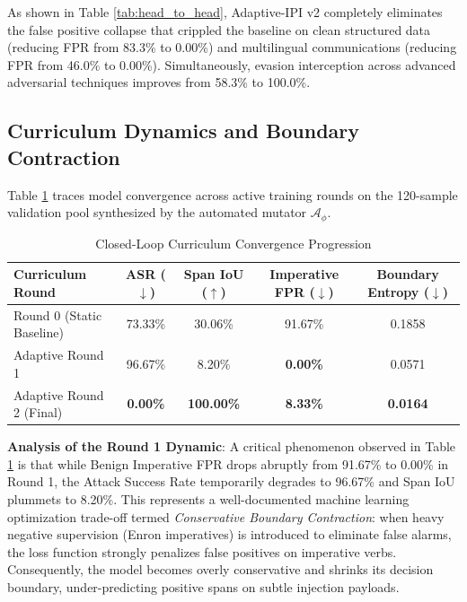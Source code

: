 \documentclass[conference]{IEEEtran}
\begin{document}
As shown in Table \ref{tab:head_to_head}, Adaptive-IPI v2 completely eliminates the false positive collapse that crippled the baseline on clean structured data (reducing FPR from 83.3\% to 0.00\%) and multilingual communications (reducing FPR from 46.0\% to 0.00\%). Simultaneously, evasion interception across advanced adversarial techniques improves from 58.3\% to 100.0\%.

\subsection{Curriculum Dynamics and Boundary Contraction}

Table \ref{tab:curriculum_progression} traces model convergence across active training rounds on the 120-sample validation pool synthesized by the automated mutator $\mathcal{A}_{\phi}$.

\begin{table}[tb]
\centering
\caption{Closed-Loop Curriculum Convergence Progression}
\label{tab:curriculum_progression}
\renewcommand{\arraystretch}{1.15}
\setlength{\tabcolsep}{4pt}
\footnotesize
\begin{tabular}{lcccc}
\toprule
\textbf{Curriculum Round} & \textbf{ASR ($\downarrow$)} & \textbf{Span IoU ($\uparrow$)} & \textbf{Imperative FPR ($\downarrow$)} & \textbf{Boundary Entropy ($\downarrow$)} \\
\midrule
Round 0 (Static Baseline) & 73.33\% & 30.06\% & 91.67\% & 0.1858 \\
Adaptive Round 1 & 96.67\% & 8.20\% & \textbf{0.00\%} & 0.0571 \\
Adaptive Round 2 (Final) & \textbf{0.00\%} & \textbf{100.00\%} & \textbf{8.33\%} & \textbf{0.0164} \\
\bottomrule
\end{tabular}
\end{table}

\textbf{Analysis of the Round 1 Dynamic}: A critical phenomenon observed in Table \ref{tab:curriculum_progression} is that while Benign Imperative FPR drops abruptly from 91.67\% to 0.00\% in Round 1, the Attack Success Rate temporarily degrades to 96.67\% and Span IoU plummets to 8.20\%. This represents a well-documented machine learning optimization trade-off termed \textit{Conservative Boundary Contraction}: when heavy negative supervision (Enron imperatives) is introduced to eliminate false alarms, the loss function strongly penalizes false positives on imperative verbs. Consequently, the model becomes overly conservative and shrinks its decision boundary, under-predicting positive spans on subtle injection payloads. 
\end{document}
